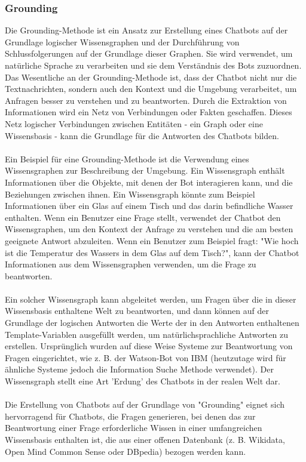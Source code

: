 \subsubsection{Grounding}
Die Grounding-Methode ist ein Ansatz zur Erstellung eines Chatbots auf der Grundlage logischer Wissensgraphen und der Durchführung von Schlussfolgerungen auf der Grundlage dieser Graphen. Sie wird verwendet, um natürliche Sprache zu verarbeiten und sie dem Verständnis des Bots zuzuordnen. Das Wesentliche an der Grounding-Methode ist, dass der Chatbot nicht nur die Textnachrichten, sondern auch den Kontext und die Umgebung verarbeitet, um Anfragen besser zu verstehen und zu beantworten. Durch die Extraktion von Informationen wird ein Netz von Verbindungen oder Fakten geschaffen. Dieses Netz logischer Verbindungen zwischen Entitäten - ein Graph oder eine Wissensbasis - kann die Grundlage für die Antworten des Chatbots bilden.\\\\
Ein Beispiel für eine Grounding-Methode ist die Verwendung eines Wissensgraphen zur Beschreibung der Umgebung. Ein Wissensgraph enthält Informationen über die Objekte, mit denen der Bot interagieren kann, und die Beziehungen zwischen ihnen. Ein Wissensgraph könnte zum Beispiel Informationen über ein Glas auf einem Tisch und das darin befindliche Wasser enthalten. Wenn ein Benutzer eine Frage stellt, verwendet der Chatbot den Wissensgraphen, um den Kontext der Anfrage zu verstehen und die am besten geeignete Antwort abzuleiten. Wenn ein Benutzer zum Beispiel fragt: "Wie hoch ist die Temperatur des Wassers in dem Glas auf dem Tisch?", kann der Chatbot Informationen aus dem Wissensgraphen verwenden, um die Frage zu beantworten.\\\\
Ein solcher Wissensgraph kann abgeleitet werden, um Fragen über die in dieser Wissensbasis enthaltene Welt zu beantworten, und dann können auf der Grundlage der logischen Antworten die Werte der in den Antworten enthaltenen Template-Variablen ausgefüllt werden, um natürlichsprachliche Antworten zu erstellen. Ursprünglich wurden auf diese Weise Systeme zur Beantwortung von Fragen eingerichtet, wie z. B. der Watson-Bot von IBM (heutzutage wird für ähnliche Systeme jedoch die Information Suche Methode verwendet). Der Wissensgraph stellt eine Art 'Erdung' des Chatbots in der realen Welt dar.\\\\
Die Erstellung von Chatbots auf der Grundlage von "Grounding" eignet sich hervorragend für Chatbots, die Fragen generieren, bei denen das zur Beantwortung einer Frage erforderliche Wissen in einer umfangreichen Wissensbasis enthalten ist, die aus einer offenen Datenbank (z. B. Wikidata, Open Mind Common Sense oder DBpedia) bezogen werden kann.\\\\
